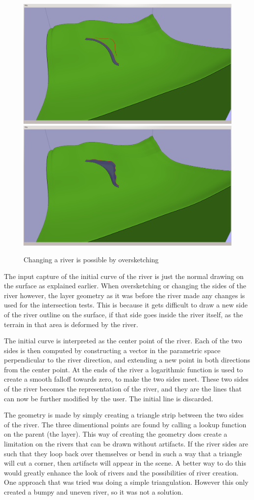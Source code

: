 \documentclass[a4paper,12pt]{report}
\begin{document}
\begin{figure}
\includegraphics[trim = 30mm 80mm 120mm 30mm, clip,width=.5\linewidth]{thesis/results/riverChange.png}
\includegraphics[trim = 30mm 80mm 120mm 30mm, clip,width=.5\linewidth]{thesis/results/riverChanged.png}
 \caption{Changing a river is possible by oversketching }
 \label{fig:riverChange}
\end{figure}

The input capture of the initial curve of the river is just the normal drawing on the surface as explained earlier. When oversketching or changing the sides of the river however, the layer geometry as it was before the river made any changes is used for the intersection tests. This is because it gets difficult to draw a new side of the river outline on the surface, if that side goes inside the river itself, as the terrain in that area is deformed by the river.

The initial curve is interpreted as the center point of the river. Each of the two sides is then computed by constructing a vector in the parametric space perpendicular to the river direction, and extending a new point in both directions from the center point. At the ends of the river a logarithmic function is used to create a smooth falloff towards zero, to make the two sides meet. These two sides of the river becomes the representation of the river, and they are the lines that can now be further modified by the user. The initial line is discarded.

The geometry is made by simply creating a triangle strip between the two sides of the river. The three dimentional points are found by calling a lookup function on the parent (the layer). This way of creating the geometry does create a limitation on the rivers that can be drawn without artifacts. If the river sides are such that they loop back over themselves or bend in such a way that a triangle will cut a corner, then artifacts will appear in the scene. A better way to do this would greatly enhance the look of rivers and the possibilities of river creation. One approach that was tried was doing a simple triangulation. However this only created a bumpy and uneven river, so it was not a solution.
\end{document}

